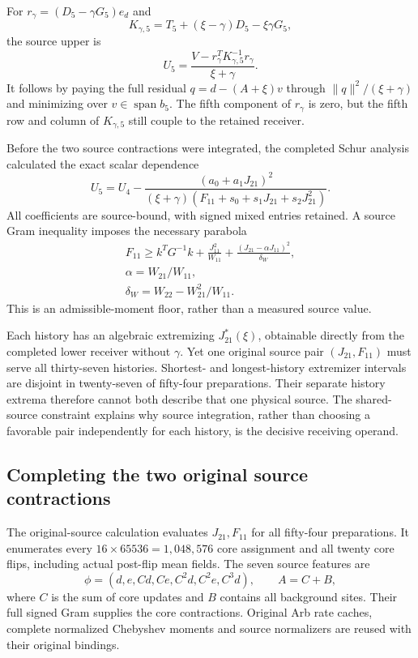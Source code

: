 For $r_\gamma=(D_5-\gamma G_5)e_d$ and
\[
 K_{\gamma,5}=T_5+(\xi-\gamma)D_5-\xi\gamma G_5,
\]
the source upper is
\[
 U_5=\frac{V-r_\gamma^TK_{\gamma,5}^{-1}r_\gamma}{\xi+\gamma}.
\]
It follows by paying the full residual $q=d-(A+\xi)v$ through $\|q\|^2/(\xi+\gamma)$ and minimizing over $v\in\operatorname{span}b_5$. The fifth component of $r_\gamma$ is zero, but the fifth row and column of $K_{\gamma,5}$ still couple to the retained receiver.

Before the two source contractions were integrated, the completed Schur analysis calculated the exact scalar dependence
\[
 U_5=U_4-
 \frac{(a_0+a_1J_{21})^2}
 {(\xi+\gamma)(F_{11}+s_0+s_1J_{21}+s_2J_{21}^2)}.
\]
All coefficients are source-bound, with signed mixed entries retained. A source Gram inequality imposes the necessary parabola
\[
\begin{gathered}
F_{11}\geq k^TG^{-1}k+\frac{J_{11}^2}{W_{11}}
 +\frac{(J_{21}-\alpha J_{11})^2}{\delta_W},
 \\
\alpha=W_{21}/W_{11},\\
\delta_W=W_{22}-W_{21}^2/W_{11}.
\end{gathered}
\]
This is an admissible-moment floor, rather than a measured source value. 

Each history has an algebraic extremizing $J_{21}^*(\xi)$, obtainable directly from the completed lower receiver without $\gamma$. Yet one original source pair $(J_{21},F_{11})$ must serve all thirty-seven histories. Shortest- and longest-history extremizer intervals are disjoint in twenty-seven of fifty-four preparations. Their separate history extrema therefore cannot both describe that one physical source. The shared-source constraint explains why source integration, rather than choosing a favorable pair independently for each history, is the decisive receiving operand.

\subsection{Completing the two original source contractions}

The original-source calculation evaluates $J_{21},F_{11}$ for all fifty-four preparations. It enumerates every $16\times65536=1{,}048{,}576$ core assignment and all twenty core flips, including actual post-flip mean fields. The seven source features are
\[
 \phi=(d,e,Cd,Ce,C^2d,C^2e,C^3d),\qquad A=C+B,
\]
where $C$ is the sum of core updates and $B$ contains all background sites. Their full signed Gram supplies the core contractions. Original Arb rate caches, complete normalized Chebyshev moments and source normalizers are reused with their original bindings. 

